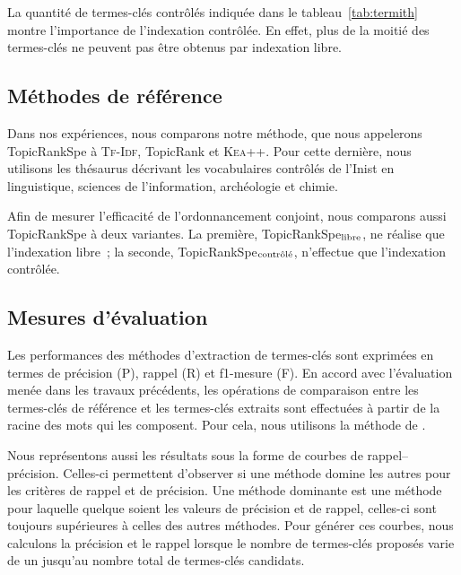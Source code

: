     La quantité de termes-clés contrôlés indiquée dans le
    tableau~\ref{tab:termith} montre l'importance de l'indexation contrôlée. En
    effet, plus de la moitié des termes-clés ne peuvent pas être obtenus par
    indexation libre.

  \subsection{Méthodes de référence}
  \label{subsec:main-domain_specific_keyphrase_annotation-supervised_automatic_keyphrase_annotation-evaluation-baselines}
    Dans nos expériences, nous comparons notre méthode, que nous appelerons
    TopicRankSpe à \textsc{Tf-Idf}, TopicRank et \textsc{Kea++}. Pour cette
    dernière, nous utilisons les thésaurus décrivant les vocabulaires contrôlés
    de l'Inist en linguistique, sciences de l'information, archéologie et chimie.

    Afin de mesurer l'efficacité de l'ordonnancement conjoint, nous comparons
    aussi TopicRankSpe à deux variantes. La première,
    TopicRankSpe$_\textnormal{libre}$, ne réalise que l'indexation
    libre~; la seconde, TopicRankSpe$_\textnormal{contrôlé}$, n'effectue
    que l'indexation contrôlée.
  
  \subsection{Mesures d'évaluation}
  \label{subsec:main-domain_specific_keyphrase_annotation-supervised_automatic_keyphrase_annotation-evaluation-evaluation_measures}
    Les performances des méthodes d'extraction de termes-clés sont exprimées
    en termes de précision (P), rappel (R) et f1-mesure (F). En
    accord avec l'évaluation menée dans les travaux précédents, les
    opérations de comparaison entre les termes-clés de référence et les
    termes-clés extraits sont effectuées à partir de la racine des mots qui
    les composent. Pour cela, nous utilisons la méthode de
    .

    Nous représentons aussi les résultats sous la forme de courbes de
    rappel--précision. Celles-ci permettent d'observer si une méthode domine
    les autres pour les critères de rappel et de précision.
    Une méthode dominante est une méthode pour laquelle quelque soient les
    valeurs de précision et de rappel, celles-ci sont toujours supérieures à
    celles des autres méthodes.
    Pour générer ces courbes, nous calculons la précision et
    le rappel lorsque  le nombre de termes-clés proposés varie de
    un jusqu'au nombre total de termes-clés candidats.
  
